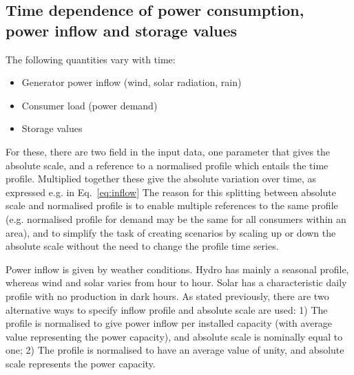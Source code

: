 \documentclass{article}
\begin{document}
\subsection{Time dependence of power consumption, power inflow and storage values}
The following quantities vary with time:
\begin{itemize}
\item Generator power inflow (wind, solar radiation, rain)
\item Consumer load (power demand)
\item Storage values
\end{itemize}

For these, there are two field in the input data, one parameter that gives the absolute scale, and a reference to a normalised profile which entails the time profile. Multiplied together these give the absolute variation over time, as expressed e.g.  in Eq.~\eqref{eq:inflow}
%
The reason for this splitting between absolute scale and normalised profile is to enable multiple references to the same profile (e.g. normalised profile for demand may be the same for all consumers within an area), and to simplify the task of creating scenarios by scaling up or down the absolute scale without the need to change the profile time series.

Power inflow is given by weather conditions. Hydro has mainly a seasonal profile, whereas wind and solar varies from hour to hour. Solar has a characteristic daily profile with no production in dark hours. 
As stated previously, there are two alternative ways to specify inflow profile and absolute scale are used: 
1) The profile is normalised to give power inflow per installed capacity (with average value representing the power capacity), and absolute scale is nominally equal to one; 
2) The profile is normalised to have an average value of unity, and absolute scale represents the power capacity.



%
%
%
%
%
%
%
%
\end{document}
